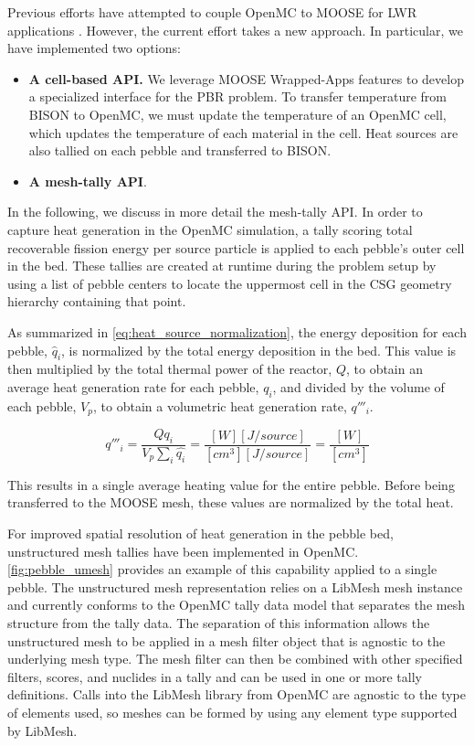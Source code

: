 Previous efforts have attempted to couple OpenMC to MOOSE for LWR applications \cite{ellis2017preliminary}.
However, the current effort takes a new approach. In particular, we have implemented two options:
\begin{itemize}
    \item \textbf{A cell-based API.}  We leverage MOOSE Wrapped-Apps features to develop a specialized interface for the PBR problem. To transfer temperature from BISON to OpenMC, we must update the temperature of an OpenMC cell, which updates the temperature of each material in the cell. Heat sources are also tallied on each pebble and transferred to BISON.
    \item \textbf{A mesh-tally API}.
\end{itemize}

In the following, we discuss in more detail the mesh-tally API. In order to capture heat generation in the OpenMC simulation, a tally scoring total recoverable fission energy per source particle is applied to each pebble's outer cell in the bed. These tallies are created at runtime during the problem setup by using a list of pebble centers to locate the uppermost cell in the CSG geometry hierarchy containing that point.

As summarized in \autoref{eq:heat_source_normalization}, the energy deposition for each pebble, $\hat{q}_{i}$, is normalized by the total energy deposition in the bed.  This value is then multiplied by the total thermal power of the reactor, $Q$, to obtain an average heat generation rate for each pebble, $q_i$, and divided by the volume of each pebble, $V_p$, to obtain a volumetric heat generation rate, $q'''_i$.

\begin{equation}
    \label{eq:heat_source_normalization}
    q'''_i = \frac{Q q_i}{V_{p}\sum_{i}{\hat{q_i}}} = \frac{[W][J/source]}{[cm^{3}] [J/source]} = \frac{[W]}{[cm^{3}]}
\end{equation}

This results in a single average heating value for the entire pebble. Before being transferred to the MOOSE mesh, these values are normalized by the total heat.

For improved spatial resolution of heat generation in the pebble bed, unstructured mesh tallies have been implemented in OpenMC. \autoref{fig:pebble_umesh} provides an example of this capability applied to a single pebble. The unstructured mesh representation relies on a LibMesh mesh instance and currently conforms to the OpenMC tally data model that separates the mesh structure from the tally data. The separation of this information allows the unstructured mesh to be applied in a mesh filter object that is agnostic to the underlying mesh type. The mesh filter can then be combined with other specified filters, scores, and nuclides in a tally and can be used in one or more tally definitions. Calls into the LibMesh library from OpenMC are agnostic to the type of elements used, so meshes can be formed by using any element type supported by LibMesh.


